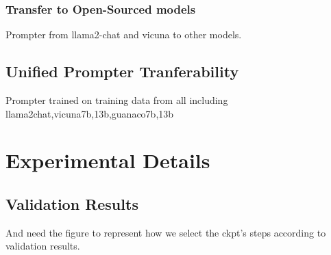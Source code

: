\documentclass{article}
\begin{document}
\subsubsection{Transfer to Open-Sourced models}
Prompter from llama2-chat and vicuna to other models.

\subsection{Unified Prompter Tranferability}
Prompter trained on training data from all including llama2chat,vicuna7b,13b,guanaco7b,13b    




\appendix
\section{Experimental Details}
\subsection{Validation Results}


And need the figure to represent how we select the ckpt's steps according to validation results.
\end{document}
